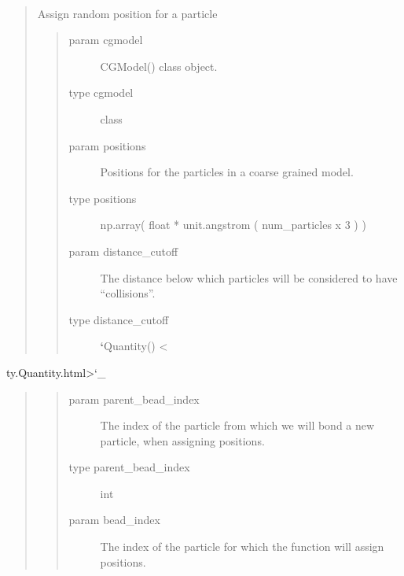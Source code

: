 \documentclass[letterpaper,12pt,english,openany,oneside]{sphinxmanual}
\begin{document}
\begin{fulllineitems}
\label{\detokenize{utilities:utilities.util.assign_position_lattice_style}}~\begin{quote}

Assign random position for a particle
\begin{quote}\begin{description}
\item[{param cgmodel}] \leavevmode
CGModel() class object.

\item[{type cgmodel}] \leavevmode
class

\item[{param positions}] \leavevmode
Positions for the particles in a coarse grained model.

\item[{type positions}] \leavevmode
np.array( float * unit.angstrom ( num\_particles x 3 ) )

\item[{param distance\_cutoff}] \leavevmode
The distance below which particles will be considered to have “collisions”.

\item[{type distance\_cutoff}] \leavevmode
{\color{red}\bfseries{}{}`}Quantity() \textless{}

\end{description}\end{quote}
\end{quote}

ty.Quantity.html\textgreater{}{}`\_
\begin{quote}
\begin{quote}\begin{description}
\item[{param parent\_bead\_index}] \leavevmode
The index of the particle from which we will bond a new particle, when assigning positions.

\item[{type parent\_bead\_index}] \leavevmode
int

\item[{param bead\_index}] \leavevmode
The index of the particle for which the function will assign positions.


\end{description}
\end{quote}
\end{quote}
\end{fulllineitems}
\end{document}
